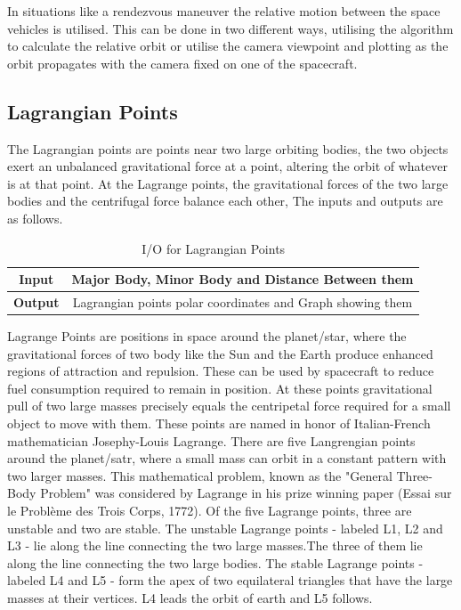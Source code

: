 In situations like a rendezvous maneuver the relative motion between the space vehicles is utilised. This can be done in two different ways, utilising the algorithm to calculate the relative orbit or utilise the camera viewpoint and plotting as the orbit propagates with the camera fixed on one of the spacecraft.
\subsection{Lagrangian Points}
The Lagrangian points are points near two large orbiting bodies, the two objects exert an unbalanced gravitational force at a point, altering the orbit of whatever is at that point. At the Lagrange points, the gravitational forces of the two large bodies and the centrifugal force balance each other, The inputs and outputs are as follows.
\begin{table}[H]
\begin{tabular}{@{}cc@{}}
\toprule
\textbf{Input}  & Major Body, Minor Body and Distance Between them           \\ \midrule
\textbf{Output} & Lagrangian points polar coordinates and Graph showing them \\ \bottomrule
\end{tabular}\caption{I/O for Lagrangian Points}
\end{table}
    Lagrange Points are positions in space around the planet/star, where the gravitational forces of two body like 
the Sun and the Earth produce enhanced regions of attraction and repulsion. These can be used by spacecraft to reduce fuel 
consumption required to remain in position. At these points gravitational pull of two large masses precisely equals the centripetal 
force required for a small object to move with them.
    These points are named in honor of Italian-French mathematician Josephy-Louis Lagrange. There are five Langrengian 
points around the planet/satr, where a small mass can orbit in a constant pattern with two larger masses.  This mathematical 
problem, known as the "General Three-Body Problem" was considered by Lagrange in his prize winning paper (Essai sur le Problème des 
Trois Corps, 1772).
    Of the five Lagrange points, three are unstable and two are stable. The unstable Lagrange points - labeled L1, L2 and L3 - lie along 
the line connecting the two large masses.The three of them lie along the line connecting the two large bodies.
The stable Lagrange points - labeled L4 and L5 - form the apex of two equilateral triangles 
that have the large masses at their vertices. L4 leads the orbit of earth and L5 follows.
